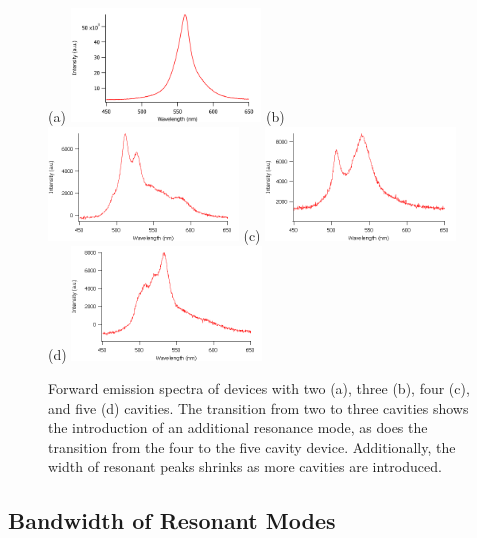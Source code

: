 \documentclass{report}
\begin{document}
        \begin{figure}[h!]
            \centering
            (a)
            \includegraphics[width=0.45\textwidth]{images/n2_fe.png}
            (b)
            \includegraphics[width=0.45\textwidth]{images/n3_fe.png}
            \newline
            (c)
            \includegraphics[width=0.45\textwidth]{images/n4_fe.png}
            (d)
            \includegraphics[width=0.45\textwidth]{images/n5_fe.png}
            \caption{Forward emission spectra of devices with two (a), three (b), four (c), and five (d) cavities. The transition from two to three cavities shows the introduction of an additional resonance mode, as does the transition from the four to the five cavity device. Additionally, the width of resonant peaks shrinks as more cavities are introduced.}
            \label{fig:fes}
        \end{figure}
        
        \subsection{Bandwidth of Resonant Modes} \label{modeWidth}
\end{document}
